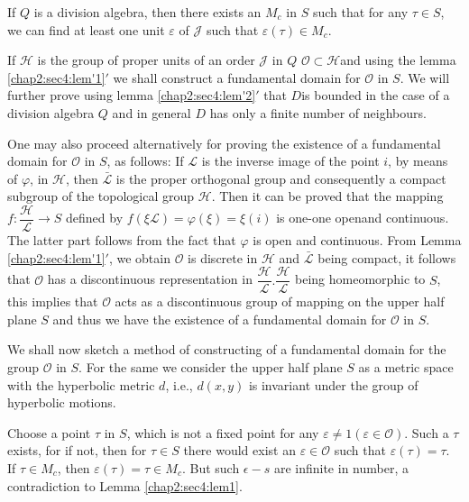\begin{lem}\label{chap2:sec4:lem'2}  %
  If $Q$ is a division algebra, then there exists an $M_c$ in $S$ such
  that for any $\tau \in S$, we can find at least one unit
  $\varepsilon$ of $\mathcal{J}$ such that $\varepsilon (\tau) \in M_c
  $.  
\end{lem}

 If $\mathscr{H}$ is the group of proper units of an order
 $\mathcal{J}$ in $Q$ $\mathscr{O} \subset \mathscr{H}$and using the
 lemma \ref{chap2:sec4:lem'1}$'$ we shall construct a fundamental
 domain for $\mathscr{O}$ in 
 $S$. We will further prove using lemma \ref{chap2:sec4:lem'2}$'$ that
 $D$is bounded in the 
 case of a division algebra $Q$ and in general $D$ has only a finite
 number of neighbours.  
 
\begin{note}
  One may also proceed alternatively for proving the existence of a
  fundamental domain for $\mathscr{O}$ in $S$, as follows: If
  $\mathcal{L}$ is the inverse image of the point $i$, by means of
  $\varphi$, in $\mathscr{H}$, then $\bar{\mathcal{L}}$ is the proper
  orthogonal group and consequently a compact subgroup of the
  topological group $\mathscr{H}$. Then it can be proved that the
  mapping $f: \dfrac{\mathscr{H}}{\mathcal{L}} \to S$ defined by $f
  (\xi \mathcal{L}) = \varphi (\xi) = \xi (i)$ is one-one open\pageoriginale and
  continuous. The latter part follows from the fact that $\varphi$ is
  open and continuous. From Lemma \ref{chap2:sec4:lem'1}$'$, we obtain $\mathscr{O}$ is
  discrete in $\mathscr{H}$ and $\bar{\mathcal{L}}$ being compact, it
  follows that $\mathscr{O}$ has a discontinuous representation in
  $\dfrac{\mathscr{H}}{\mathcal{L}}. \dfrac{\mathscr{H}}{\mathcal{L}}$
  being homeomorphic to $S$, this implies that $\mathscr{O}$ acts as a
  discontinuous group of mapping on the upper half plane $S$ and thus
  we have the existence of a fundamental domain for $\mathscr{O}$ in
  $S$.  
\end{note}
   
We shall now sketch a method of constructing of a fundamental domain
for the group $\mathscr{O}$ in $S$. For the same we consider the upper
half plane $S$ as a metric space with the hyperbolic metric $d$,
i.e.,  $d(x, y)$ is invariant under the group of hyperbolic motions.  

Choose a point $\tau$ in $S$, which is not a fixed point for any $\varepsilon
\neq 1 (\varepsilon \in \mathscr{O})$. Such a $\tau$ exists, for if
not, then for $\tau \in S$ there would exist an $\varepsilon \in
\mathscr{O}$ such that $\varepsilon (\tau) = \tau$. If $\tau \in M_c$,
then $\varepsilon (\tau) = \tau \in M_c$. But such $\epsilon -s$
are infinite in number, a contradiction to Lemma \ref{chap2:sec4:lem1}.  

